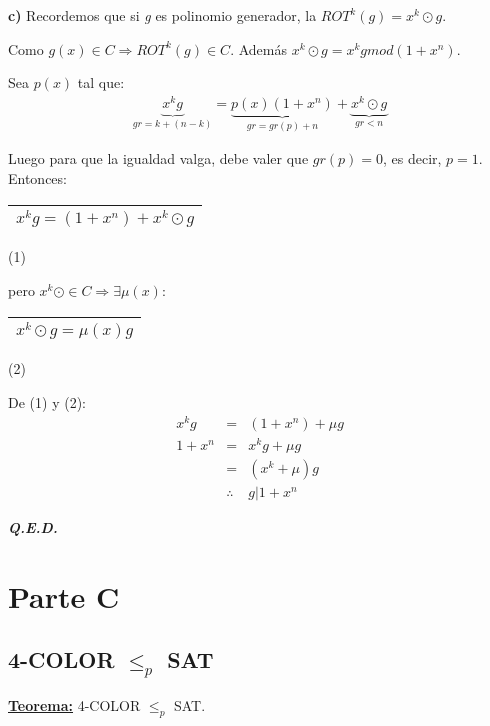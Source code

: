 \documentclass[12pt,a4paper]{report}
\newcommand{\QED}{\hfill \textit{\textbf{Q.E.D.}}}
\begin{document}
			\textbf{c)} Recordemos que si \textit{g} es polinomio generador, la $ROT^{k}(g) = x^{k} \odot g$.
			\vspace{5mm}
			\par Como $g(x) \in C \Rightarrow ROT^{k}(g) \in C$. Además $x^{k} \odot g = x^{k} g mod (1 + x^{n}).$
			\vspace{3mm}
			\par Sea $p(x)$ tal que:
			\begin{eqnarray}
				\nonumber \underbrace{x^{k} g}_{gr = k + (n - k)} = \underbrace{p(x) (1 + x^{n})}_{gr = gr(p) + n} + \underbrace{x^{k} \odot g}_{gr < n}
			\end{eqnarray}
			\par Luego para que la igualdad valga, debe valer que $gr(p)	= 0$, es decir, $p = 1$. Entonces:
			\begin{center}
				\begin{tabular}{|c|} \hline $ x^{k} g = (1 + x^{n}) + x^{k} \odot g $ \\\hline \end{tabular} (1)
			\end{center}

			\par pero $x^{k} \odot \in C \Rightarrow \exists \mu(x) :$
			\begin{center}
				\begin{tabular}{|c|} \hline $ x^{k} \odot g = \mu(x) g $ \\\hline \end{tabular} (2)
			\end{center}

			\vspace{3mm}
			\par De (1) y (2):
			\begin{eqnarray}
				\nonumber x^{k} g &=& (1 + x^{n}) + \mu g \\
				\nonumber 1 + x^{n} &=& x^{k} g+ \mu g \\
				\nonumber &=& (x^{k} + \mu) g \\
				\nonumber & \therefore & g | 1 + x^{n}
			\end{eqnarray}

		\QED


\chapter{Parte C}

	\section{4-COLOR $\leq_{\textit{p}}$ SAT}
		\textbf{\underline{Teorema:}} 4-COLOR $\leq_{p}$ SAT.
\end{document}

